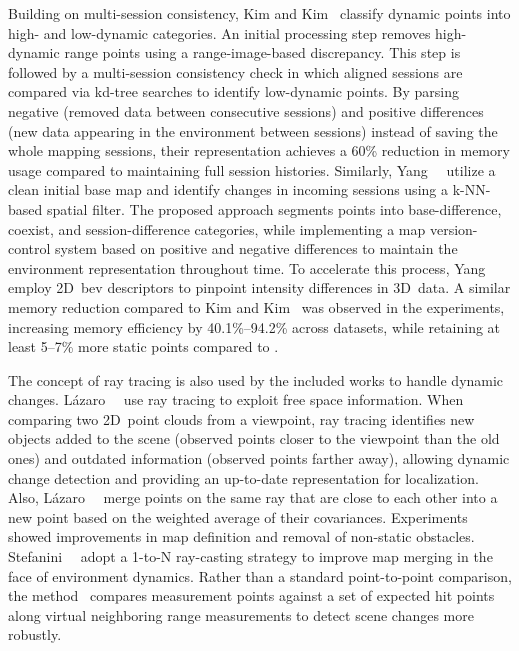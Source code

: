 Building on multi-session consistency,
Kim and Kim~\cite{kim:icra:2022} classify dynamic points into
high- and low-dynamic categories. An initial processing step
removes high-dynamic range points using a range-image-based discrepancy.
This step is followed by a multi-session consistency check
in which aligned sessions are compared via kd-tree searches
to identify low-dynamic points. By parsing negative
(removed data between consecutive sessions) and positive differences
(new data appearing in the environment between sessions)
instead of saving the whole mapping sessions,
their representation achieves a 60\% reduction in memory usage
compared to maintaining full session histories.
Similarly, Yang~\etal~\cite{yang:ral:2024} utilize a clean initial base map and
identify changes in incoming sessions using a k-NN-based spatial filter.
The proposed approach segments points into base-difference, coexist,
and session-difference categories, while implementing a map version-control
system based on positive and negative differences
to maintain the environment representation throughout time.
To accelerate this process, Yang~\etal~\cite{yang:ral:2024} employ
2D~\gls{bev} descriptors to pinpoint intensity differences in 3D~data.
A similar memory reduction compared to Kim and Kim~\cite{kim:icra:2022}
was observed in the experiments, increasing memory efficiency
by 40.1\%--94.2\% across datasets, while retaining
at least 5--7\% more static points compared to \cite{kim:icra:2022}.

The concept of ray tracing is also used by the included works
to handle dynamic changes. Lázaro~\etal~\cite{lazaro:iros:2018}
use ray tracing to exploit free space information.
When comparing two 2D~point clouds from a viewpoint,
ray tracing identifies new objects added to the scene
(observed points closer to the viewpoint than the old ones)
and outdated information (observed points farther away), allowing dynamic
change detection and providing an up-to-date representation for localization.
Also, Lázaro~\etal~\cite{lazaro:iros:2018} merge points on the same ray
that are close to each other into a new point based on
the weighted average of their covariances. Experiments showed
improvements in map definition and removal of non-static obstacles.
Stefanini~\etal~\cite{stefanini:sensors:2023} adopt a 1-to-N ray-casting
strategy to improve map merging in the face of environment dynamics.
Rather than a standard point-to-point comparison,
the method~\cite{stefanini:sensors:2023} compares measurement points against
a set of expected hit points along virtual neighboring range measurements
to detect scene changes more robustly.

